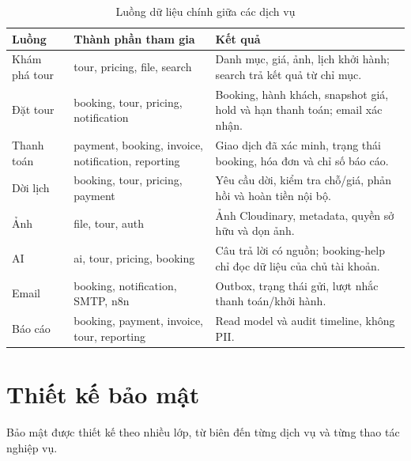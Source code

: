 \begin{table}[H]
\centering
\caption{Luồng dữ liệu chính giữa các dịch vụ}
\label{tab:luong-du-lieu}
\small
\begin{tabularx}{\textwidth}{@{}L{2.8cm}L{6.0cm}Y@{}}
\toprule
\textbf{Luồng} & \textbf{Thành phần tham gia} & \textbf{Kết quả}\\
\midrule
Khám phá tour & tour, pricing, file, search & Danh mục, giá, ảnh, lịch khởi hành; search trả kết quả từ chỉ mục.\\
Đặt tour & booking, tour, pricing, notification & Booking, hành khách, snapshot giá, hold và hạn thanh toán; email xác nhận.\\
Thanh toán & payment, booking, invoice, notification, reporting & Giao dịch đã xác minh, trạng thái booking, hóa đơn và chỉ số báo cáo.\\
Dời lịch & booking, tour, pricing, payment & Yêu cầu dời, kiểm tra chỗ/giá, phản hồi và hoàn tiền nội bộ.\\
Ảnh & file, tour, auth & Ảnh Cloudinary, metadata, quyền sở hữu và dọn ảnh.\\
AI & ai, tour, pricing, booking & Câu trả lời có nguồn; booking-help chỉ đọc dữ liệu của chủ tài khoản.\\
Email & booking, notification, SMTP, n8n & Outbox, trạng thái gửi, lượt nhắc thanh toán/khởi hành.\\
Báo cáo & booking, payment, invoice, tour, reporting & Read model  và audit timeline, không PII.\\
\bottomrule
\end{tabularx}
\end{table}

\section{Thiết kế bảo mật}
\label{sec:bao-mat}

Bảo mật được thiết kế theo nhiều lớp, từ biên đến từng dịch vụ và từng thao tác nghiệp vụ.

